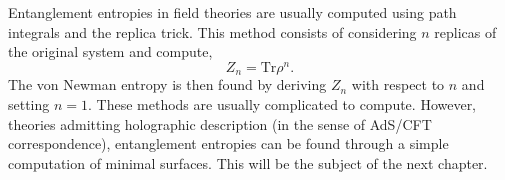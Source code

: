 Entanglement entropies in field theories are usually computed using path integrals and the replica trick. This method consists of considering $n$ replicas of the original system and compute,
\begin{equation}
    Z_n=\text{Tr}\rho^n.
\end{equation}
The von Newman entropy is then found by deriving $Z_n$ with respect to $n$ and setting $n=1$. These methods are usually complicated to compute. However, theories admitting holographic description (in the sense of AdS/CFT correspondence), entanglement entropies can be found through a simple computation of minimal surfaces. This will be the subject of the next chapter. 
